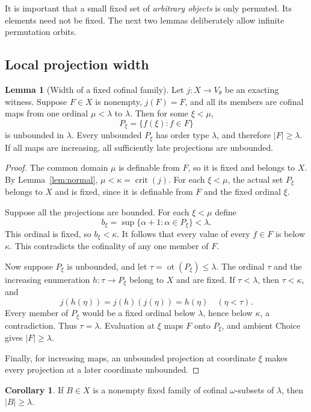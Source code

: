 \documentclass[11pt,letterpaper]{article}
\theoremstyle{definition}
\newtheorem{lemma}[definition]{Lemma}
\newtheorem{corollary}[definition]{Corollary}
\numberwithin{equation}{section}
\newcommand{\crit}{\operatorname{crit}}
\newcommand{\ot}{\operatorname{ot}}
\begin{document}
It is important that a small fixed set of \emph{arbitrary objects} is only permuted. Its elements need not be fixed. The next two lemmas deliberately allow infinite permutation orbits.

\subsection{Local projection width}

\begin{lemma}[Width of a fixed cofinal family]\label{lem:local-width}
Let $j:X\to V_\theta$ be an exacting witness. Suppose $F\in X$ is nonempty, $j(F)=F$, and all its members are cofinal maps from one ordinal $\mu<\lambda$ to $\lambda$. Then for some $\xi<\mu$,
\[
P_\xi=\{f(\xi):f\in F\}
\]
is unbounded in $\lambda$. Every unbounded $P_\xi$ has order type $\lambda$, and therefore $|F|\ge\lambda$. If all maps are increasing, all sufficiently late projections are unbounded.
\end{lemma}

\begin{proof}
The common domain $\mu$ is definable from $F$, so it is fixed and belongs to $X$. By Lemma~\ref{lem:normal}, $\mu<\kappa=\crit(j)$. For each $\xi<\mu$, the actual set $P_\xi$ belongs to $X$ and is fixed, since it is definable from $F$ and the fixed ordinal $\xi$.

Suppose all the projections are bounded. For each $\xi<\mu$ define
\[
b_\xi=\sup\{\alpha+1:\alpha\in P_\xi\}<\lambda.
\]
This ordinal is fixed, so $b_\xi<\kappa$. It follows that every value of every $f\in F$ is below $\kappa$. This contradicts the cofinality of any one member of $F$.

Now suppose $P_\xi$ is unbounded, and let $\tau=\ot(P_\xi)\le\lambda$. The ordinal $\tau$ and the increasing enumeration $h:\tau\to P_\xi$ belong to $X$ and are fixed. If $\tau<\lambda$, then $\tau<\kappa$, and
\[
j(h(\eta))=j(h)(j(\eta))=h(\eta)\quad(\eta<\tau).
\]
Every member of $P_\xi$ would be a fixed ordinal below $\lambda$, hence below $\kappa$, a contradiction. Thus $\tau=\lambda$. Evaluation at $\xi$ maps $F$ onto $P_\xi$, and ambient Choice gives $|F|\ge\lambda$.

Finally, for increasing maps, an unbounded projection at coordinate $\xi$ makes every projection at a later coordinate unbounded.
\end{proof}

\begin{corollary}\label{cor:local-subsets}
If $B\in X$ is a nonempty fixed family of cofinal $\omega$-subsets of $\lambda$, then $|B|\ge\lambda$.
\end{corollary}
\end{document}
